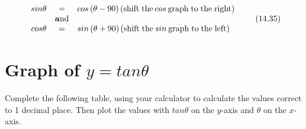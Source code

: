 \label{m39414*id88844}\nopagebreak\noindent{}
\begin{equation}
\begin{array}{ccc}\hfill sin\theta & =& cos\left(\theta -90\right)\left(\mathrm{shift\; the}\phantom{\rule{2.pt}{0ex}}cos\phantom{\rule{2.pt}{0ex}}\mathrm{graph\; to\; the\; right}\right)\hfill \\ & \mathbf{a}\mathrm{nd}& \\ \hfill cos\theta & =& sin\left(\theta +90\right)\left(\mathrm{shift\; the}\phantom{\rule{2.pt}{0ex}}sin\phantom{\rule{2.pt}{0ex}}\mathrm{graph\; to\; the\; left}\right)\hfill \end{array}\tag{14.35}
\end{equation}
\label{m39414*secfhsst!!!underscore!!!id2937}
\section{  Graph of $y=tan\theta $ }
\nopagebreak
\label{m39414*uid982734}Complete the following table, using your calculator to calculate the values correct to 1 decimal place. Then plot the values with $tan\theta $ on the $y$-axis and $\theta $ on the $x$-axis.\par 
\setlength\mytablespace{16\tabcolsep}
\addtolength\mytablespace{9\arrayrulewidth}
